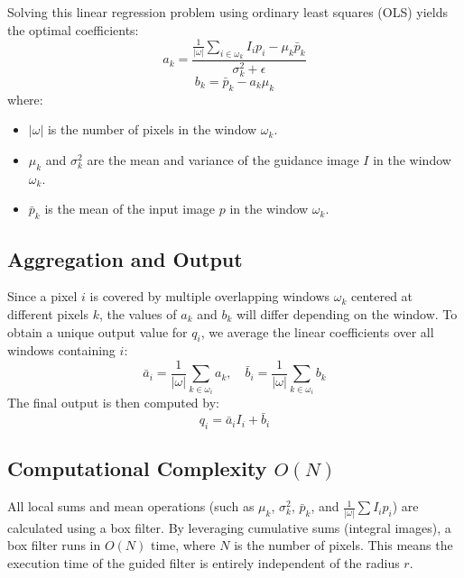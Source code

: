 \documentclass[11pt,a4paper]{article}
\begin{document}
Solving this linear regression problem using ordinary least squares (OLS) yields the optimal coefficients:
\begin{equation}
    a_k = \frac{\frac{1}{|\omega|} \sum_{i \in \omega_k} I_i p_i - \mu_k \bar{p}_k}{\sigma_k^2 + \epsilon}
\end{equation}
\begin{equation}
    b_k = \bar{p}_k - a_k \mu_k
\end{equation}
where:
\begin{itemize}
    \item $|\omega|$ is the number of pixels in the window $\omega_k$.
    \item $\mu_k$ and $\sigma_k^2$ are the mean and variance of the guidance image $I$ in the window $\omega_k$.
    \item $\bar{p}_k$ is the mean of the input image $p$ in the window $\omega_k$.
\end{itemize}

\subsection{Aggregation and Output}
Since a pixel $i$ is covered by multiple overlapping windows $\omega_k$ centered at different pixels $k$, the values of $a_k$ and $b_k$ will differ depending on the window. To obtain a unique output value for $q_i$, we average the linear coefficients over all windows containing $i$:
\begin{equation}
    \bar{a}_i = \frac{1}{|\omega|} \sum_{k \in \omega_i} a_k, \quad \bar{b}_i = \frac{1}{|\omega|} \sum_{k \in \omega_i} b_k
\end{equation}
The final output is then computed by:
\begin{equation}
    q_i = \bar{a}_i I_i + \bar{b}_i
\end{equation}

\subsection{Computational Complexity $O(N)$}
All local sums and mean operations (such as $\mu_k$, $\sigma_k^2$, $\bar{p}_k$, and $\frac{1}{|\omega|} \sum I_i p_i$) are calculated using a box filter. By leveraging cumulative sums (integral images), a box filter runs in $O(N)$ time, where $N$ is the number of pixels. This means the execution time of the guided filter is entirely independent of the radius $r$.

\end{document}
